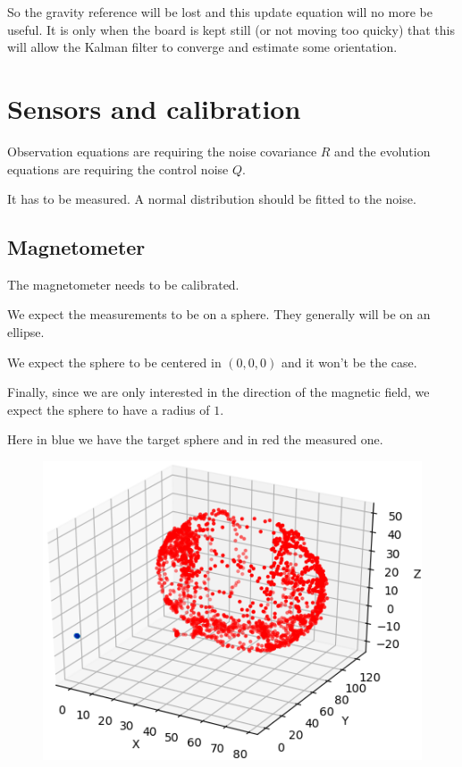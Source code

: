 \documentclass[titlepage,a4,12pt]{article}
\numberwithin{equation}{subsection}
\begin{document}
So the gravity reference will be lost and this update equation will no more be useful. It is only when the board is kept still (or not moving too quicky) that this will allow the Kalman filter to converge and estimate some orientation.


\section{Sensors and calibration}

Observation equations are requiring the noise covariance $R$ and the evolution equations are requiring the control noise $Q$.

It has to be measured. A normal distribution should be fitted to the noise.


\subsection{Magnetometer}

The magnetometer needs to be calibrated.

We expect the measurements to be on a sphere. They generally will be on an ellipse.

We expect the sphere to be centered in $(0,0,0)$ and it won't be the case.

Finally, since we are only interested in the direction of the magnetic field, we expect the sphere to have a radius of $1$.

Here in blue we have the target sphere and in red the measured one.

\begin{figure}[H]
\includegraphics{uncalibratedmag.png}
\end{figure}
\end{document}
